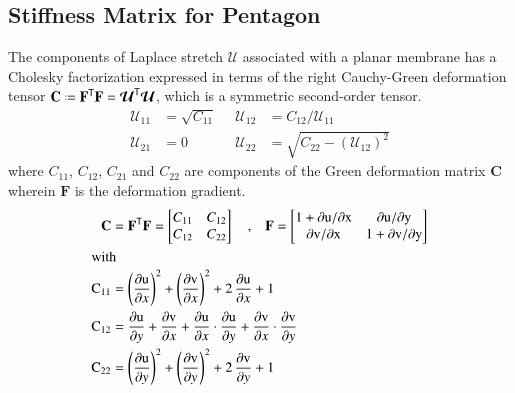 \subsection{Stiffness Matrix for Pentagon}
The components of Laplace stretch $\boldsymbol{\mathcal{U}}$ associated with a planar membrane has a  Cholesky factorization expressed in terms of the right Cauchy-Green deformation tensor $\mathbf{C} \defeq \mathbf{F}^{\mathsf{T}} \mathbf{F} = \boldsymbol{\mathcal{U}}^{\mathsf{T}} \boldsymbol{\mathcal{U}}$, which is a symmetric second-order tensor. 
\begin{equation}
\begin{aligned}
{\mathcal{U}}_{11} & = \sqrt{C_{11}} \;\; & 
{\mathcal{U}}_{12} & = C_{12} / {\mathcal{U}_{11}} \\
{\mathcal{U}}_{21} & = 0 &
{\mathcal{U}}_{22} & = \sqrt{C_{22} - ({\mathcal{U}}_{12})^2} 
\end{aligned}
\label{Laplace stretchComponents}
\end{equation} 
where ${C_{11}}$, ${C_{12}}$, ${C_{21}}$ and ${C_{22}}$ are components of the Green deformation matrix $\mathbf{C}$ wherein  $\mathbf{F}$ is the deformation gradient.
\begin{subequations}
	\begin{align}
	\mathbf{C} &= \mathbf{F}^{\mathsf{T}} \mathbf{F} =
	\begin{bmatrix}
	C_{11} & C_{12}  \\
	C_{12} & C_{22} 
	\end{bmatrix} \quad \textrm{,} \quad
	\mathbf{F} =  
	\begin{bmatrix}
	1+\mathrm{\partial u / \partial x} & \mathrm{\partial u / \partial y}  \\
	\mathrm{\partial v / \partial x} & 1+\mathrm{\partial v / \partial y}
	\end{bmatrix}\\
	\intertext{with}
	\mathrm{C_{11}}&= \left(\frac{\mathrm{\partial u}}{\partial x}\right)^2+ \left(\frac{\mathrm{\partial v}}{\partial x}\right)^2 + 2\, \frac{\mathrm{\partial u}}{\partial x}  + 1\\
	\mathrm{C_{12}}&= \frac{\mathrm{\partial u}}{\partial y} + \frac{\mathrm{\partial v}}{\partial x} + \frac{\mathrm{\partial u}}{\partial x} \cdot \frac{\mathrm{\partial u}}{\partial y} + \frac{\mathrm{\partial v}}{\partial x} \cdot \frac{\mathrm{\partial v}}{\partial y}\\
	\mathrm{C_{22}}&= \left(\frac{\mathrm{\partial u}}{\partial y}\right)^2 + \left(\frac{\mathrm{\partial v}}{\partial y}\right)^2 + 2\, \frac{\mathrm{\partial v}}{\partial y} + 1
	\end{align}
\end{subequations}

